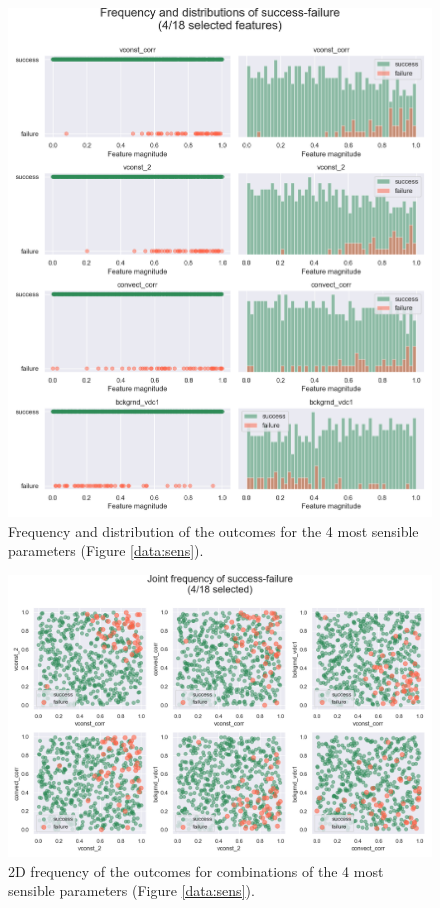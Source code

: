 \documentclass[english,notitlepage,reprint,nofootinbib]{revtex4-1}  %
\begin{document}
\begin{figure}[h]
    \centering 
    \includegraphics[scale=0.3]{dataset/distributions_sel.png}
    \caption{Frequency and distribution of the outcomes for the 4 most sensible parameters (Figure \ref{data:sens}).}
    \label{data:1d}
\end{figure}
\begin{figure}[h]
    \centering 
    \includegraphics[scale=0.28]{dataset/distributions_2D_sel.png}
    \caption{2D frequency of the outcomes for combinations of the 4 most sensible parameters (Figure \ref{data:sens}).}
    \label{data:2d}
\end{figure}
\end{document}
